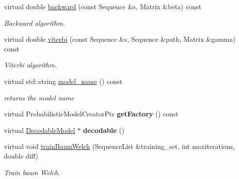 \begin{DoxyCompactItemize}
\mbox{\label{classtops_1_1HiddenMarkovModel_aaa1cfc9715c087d453985b5c2d3e02af}} 
virtual double \hyperlink{classtops_1_1HiddenMarkovModel_aaa1cfc9715c087d453985b5c2d3e02af}{backward} (const Sequence \&s, Matrix \&beta) const
\begin{DoxyCompactList}\small\item\em Backward algorithm. \end{DoxyCompactList}\item 
\mbox{\label{classtops_1_1HiddenMarkovModel_a40eae6b0b0def5afc0c8051db926e6a8}} 
virtual double \hyperlink{classtops_1_1HiddenMarkovModel_a40eae6b0b0def5afc0c8051db926e6a8}{viterbi} (const Sequence \&s, Sequence \&path, Matrix \&gamma) const
\begin{DoxyCompactList}\small\item\em Viterbi algorithm. \end{DoxyCompactList}\item 
\mbox{\label{classtops_1_1HiddenMarkovModel_a1c3e76b1359651087a527a56b161969f}} 
virtual std\+::string \hyperlink{classtops_1_1HiddenMarkovModel_a1c3e76b1359651087a527a56b161969f}{model\+\_\+name} () const
\begin{DoxyCompactList}\small\item\em returns the model name \end{DoxyCompactList}\item 
\mbox{\label{classtops_1_1HiddenMarkovModel_ade43f35f76f240e4672287229f786daa}} 
virtual Probabilistic\+Model\+Creator\+Ptr {\bfseries get\+Factory} () const
\item 
\mbox{\label{classtops_1_1HiddenMarkovModel_a3c359333874ba9716404bffe44848949}} 
virtual \hyperlink{classtops_1_1DecodableModel}{Decodable\+Model} $\ast$ {\bfseries decodable} ()
\item 
\mbox{\label{classtops_1_1HiddenMarkovModel_a5fbe607e546d580e9e32ae01b2a07fd0}} 
virtual void \hyperlink{classtops_1_1HiddenMarkovModel_a5fbe607e546d580e9e32ae01b2a07fd0}{train\+Baum\+Welch} (Sequence\+List \&training\+\_\+set, int maxiterations, double diff)
\begin{DoxyCompactList}\small\item\em Train baum Welch. \end{DoxyCompactList}\item 

\end{DoxyCompactItemize}

